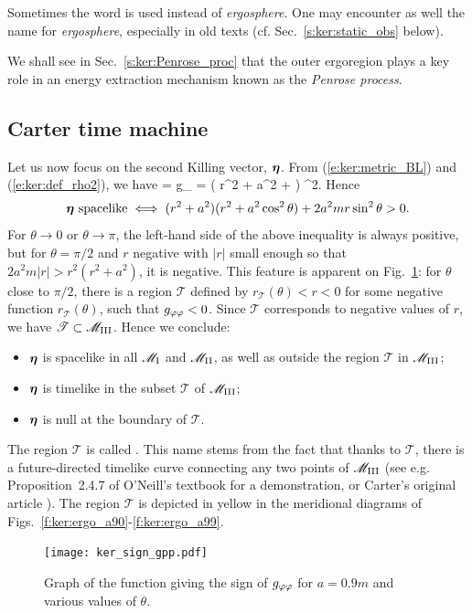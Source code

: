 \begin{remark} \label{r:ker:static_limit}
Sometimes the word  is used instead of
\emph{ergosphere}. One may encounter as well the name 
for \emph{ergosphere}, especially in old texts (cf. Sec.~\ref{s:ker:static_obs} below).
\end{remark}

We shall see in Sec.~\ref{s:ker:Penrose_proc} that the outer ergoregion
plays a key role in an energy extraction mechanism known as the
\emph{Penrose process}.

\subsection{Carter time machine} \label{s:ker:time_machine}

Let us now focus on the second Killing vector, $\bm{\eta}$.
From (\ref{e:ker:metric_BL}) and (\ref{e:ker:def_rho2}), we have
\be \label{e:ker:eta_square}
    \w{\eta}\cdot\w{\eta} = g_{\ph\ph} = \left( r^2 + a^2 +  \right) \sin^2\th .
\ee
Hence
\[
    \w{\eta}\ \mbox{spacelike} \iff
        (r^2 + a^2)(r^2 + a^2\cos^2\th) + 2 a^2 m r \sin^2\th > 0 .
\]
For $\theta\rightarrow 0$ or $\theta\rightarrow\pi$, the left-hand side of the above inequality
is always positive, but for $\theta=\pi/2$ and $r$ negative with $|r|$
small enough so that $2 a^2 m |r| > r^2(r^2 + a^2)$, it is negative. This feature
is apparent on Fig.~\ref{f:ker:sign_gpp}: for $\theta$ close to $\pi/2$,
there is a region $\mathscr{T}$ defined by $r_{\mathscr{T}}(\theta) < r < 0$ for some
negative function $r_{\mathscr{T}}(\theta)$, such that $g_{\varphi\varphi}<0$.
Since $\mathscr{T}$ corresponds to negative values of $r$, we have
$\mathscr{T}\subset \mathscr{M}_{\rm III}$.
Hence we conclude:
\begin{itemize}
\item $\bm{\eta}$ is spacelike in all $\mathscr{M}_{\rm I}$ and $\mathscr{M}_{\rm II}$, as well
as outside the region $\mathscr{T}$ in $\mathscr{M}_{\rm III}$;
\item $\bm{\eta}$ is timelike in the subset $\mathscr{T}$ of $\mathscr{M}_{\rm III}$;
\item $\bm{\eta}$ is null at the boundary of $\mathscr{T}$.
\end{itemize}
The region $\mathscr{T}$ is called
.
This name stems from the fact that thanks to $\mathscr{T}$, there is
a future-directed timelike curve connecting any two points of $\mathscr{M}_{\rm III}$
(see e.g. Proposition~2.4.7 of O'Neill's textbook \cite{ONeil95} for a
demonstration, or Carter's original article \cite{Carte68a}).
The region $\mathscr{T}$ is depicted in yellow in the meridional
diagrams of
Figs.~\ref{f:ker:ergo_a90}-\ref{f:ker:ergo_a99}.
\begin{figure}
\centerline{\texttt{[image: ker\_sign\_gpp.pdf]}}
\caption[]{\label{f:ker:sign_gpp} \footnotesize
Graph of the function giving the sign of $g_{\varphi\varphi}$ for $a=0.9m$
and various values of $\theta$.}
\end{figure}


